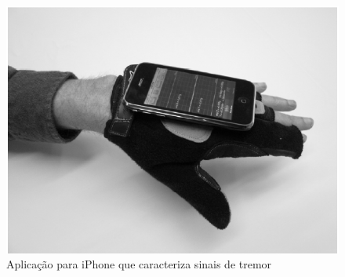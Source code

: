 \begin{figure}
 \centering
 \includegraphics[scale=0.3]{./img/moyne-iphone.png}
\caption[Aplicação para iPhone que caracteriza sinais de tremor]{Aplicação para iPhone que caracteriza sinais de tremor ~\cite{lemoyne2010}}
 \label{fig:iphone-tremor}
\end{figure}






